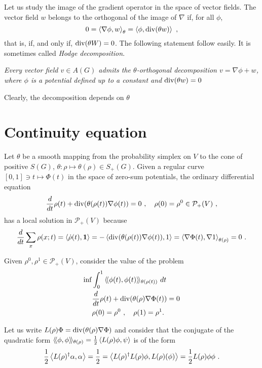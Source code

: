 \documentclass[12pt,a4paper]{amsart}
\begin{document}
Let us study the image of the gradient operator in the space of vector
fields. The vector field $w$ belongs to the  orthogonal of the image of
$\nabla$ if, for all $\phi$,
\begin{equation*}
  0 = \scalarat \theta {\nabla \phi} w = \scalarof \phi {\Div(\theta
    w)} \ ,
\end{equation*}
that is, if, and only if, $\Div(\theta W) = 0$. The following
statement follow easily. It is sometimes called \emph{Hodge decomposition}.

\emph{Every vector field $v \in A(G)$ admits the $\theta$-orthogonal
  decomposition $v = \nabla \phi + w$, where $\phi$ is a potential
  defined up to a constant and $\Div(\theta w) = 0$}

Clearly, the decomposition depends on $\theta$

\section{Continuity equation}
\label{sec:continuity}

Let $\theta$ be a smooth mapping from the probability simplex on $V$ to the
cone of positive $S(G)$, $\theta \colon \rho \mapsto \theta(\rho) \in
S_+(G)$. Given a regular curve $[0,1] \ni t \mapsto \Phi(t)$ in the
space of zero-sum potentials, the ordinary differential equation
\begin{equation*}
  \derivby t \rho(t) +  \Div(\theta(\rho(t))\nabla \phi(t)) = 0 \ , \quad
  \rho(0) = \rho^0 \in \mathcal P_+(V) \ ,
\end{equation*}
has a local solution in $\mathcal P_+(V)$ because
\begin{equation*}
  \derivby t \sum_x \rho(x;t) = \scalarof {\dot \rho(t)}{\one} = 
 - \scalarof {\Div(\theta(\rho(t))\nabla \phi(t))}{1} = \scalarat
 {\theta(\rho)} {\nabla \Phi(t)}{\nabla 1}
 = 0 \ .
\end{equation*}

Given $\rho^0, \rho^1 \in \mathcal P_+(V)$, consider the value of the problem
\begin{align*}
 \inf &\int_0^1 \Scalarat {\theta(\rho(t))} {\phi(t)}{\phi(t)} \ dt
 \\
 &\derivby t \rho(t) +  \Div(\theta(\rho)\nabla \Phi(t)) = 0 \\
 &\rho(0) = \rho^0 \ , \quad \rho(1) = \rho^1.
\end{align*}

Let us write $L(\rho)\Phi = \Div(\theta(\rho)\nabla \Phi)$ and
consider that the conjugate of the quadratic form
$\Scalarat {\theta(\rho)} \phi \phi = \frac 12 \scalarof {L(\rho)\phi}
\psi$ is of the form
\begin{equation*}
  \frac 12 \scalarof {L(\rho)^\dagger \alpha} {\alpha} = \frac12 =
  \scalarof {L(\rho)^\dagger L(\rho) \phi} {L(\rho)(\phi)} = \frac12
  {L(\rho) \phi} \phi \ . 
\end{equation*}
\end{document}
